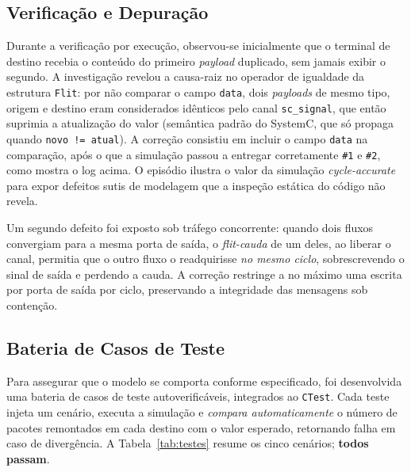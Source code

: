\documentclass[conference]{IEEEtran}
\begin{document}
\subsection{Verificação e Depuração}
Durante a verificação por execução, observou-se inicialmente que o terminal de
destino recebia o conteúdo do primeiro \emph{payload} duplicado, sem jamais
exibir o segundo. A investigação revelou a causa-raiz no operador de igualdade da
estrutura \texttt{Flit}: por não comparar o campo \texttt{data}, dois
\emph{payloads} de mesmo tipo, origem e destino eram considerados idênticos pelo
canal \texttt{sc\_signal}, que então suprimia a atualização do valor (semântica
padrão do SystemC, que só propaga quando \texttt{novo != atual}). A correção
consistiu em incluir o campo \texttt{data} na comparação, após o que a simulação
passou a entregar corretamente \texttt{\#1} e \texttt{\#2}, como mostra o log
acima. O episódio ilustra o valor da simulação \emph{cycle-accurate} para expor
defeitos sutis de modelagem que a inspeção estática do código não revela.

Um segundo defeito foi exposto sob tráfego concorrente: quando dois fluxos
convergiam para a mesma porta de saída, o \emph{flit-cauda} de um deles, ao
liberar o canal, permitia que o outro fluxo o readquirisse \emph{no mesmo
ciclo}, sobrescrevendo o sinal de saída e perdendo a cauda. A correção restringe
a no máximo uma escrita por porta de saída por ciclo, preservando a integridade
das mensagens sob contenção.

\subsection{Bateria de Casos de Teste}
Para assegurar que o modelo se comporta conforme especificado, foi desenvolvida
uma bateria de casos de teste autoverificáveis, integrados ao \texttt{CTest}.
Cada teste injeta um cenário, executa a simulação e \emph{compara
automaticamente} o número de pacotes remontados em cada destino com o valor
esperado, retornando falha em caso de divergência. A Tabela~\ref{tab:testes}
resume os cinco cenários; \textbf{todos passam}.
\end{document}
